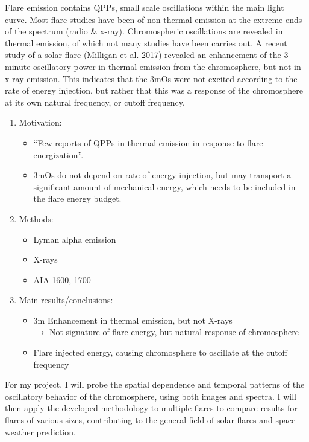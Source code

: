\begin{framed}
Flare emission contains QPPs, small scale oscillations within the main light
curve. Most flare studies have been of non-thermal emission at the extreme ends
of the spectrum (radio \& x-ray). Chromospheric oscillations are revealed in
thermal emission, of which not many studies have been carries out. A recent
study of a solar flare (Milligan et al. 2017) revealed an enhancement of the
3-minute oscillatory power in thermal emission from the chromosphere, but not
in x-ray emission. This indicates that the 3mOs were not excited according to
the rate of energy injection, but rather that this was a response of the
chromosphere at its own natural frequency, or cutoff frequency.
\begin{enumerate}
    \item Motivation:
        \begin{itemize}
            \item ``Few reports of QPPs in thermal emission in response to flare
                energization''.
            \item 3mOs do not depend on rate of energy injection, but may
                transport a significant amount of mechanical energy, which
                needs to be included in the flare energy budget.
        \end{itemize}
    \item Methods:
        \begin{itemize}
            \item Lyman alpha emission
            \item X-rays
            \item AIA 1600, 1700
        \end{itemize}
    \item Main results/conclusions:
        \begin{itemize}
            \item 3m Enhancement in thermal emission, but not X-rays\\
                $\rightarrow$ Not signature of flare energy, but natural
                response of chromosphere
            \item Flare injected energy, causing chromosphere to oscillate at
                the cutoff frequency
        \end{itemize}
\end{enumerate}

For my project, I will probe the spatial dependence and temporal patterns of
the oscillatory behavior of the chromosphere, using both images and spectra.
I will then apply the developed methodology to multiple flares to compare
results for flares of various sizes, contributing to the general field of
solar flares and space weather prediction.


\end{framed}
